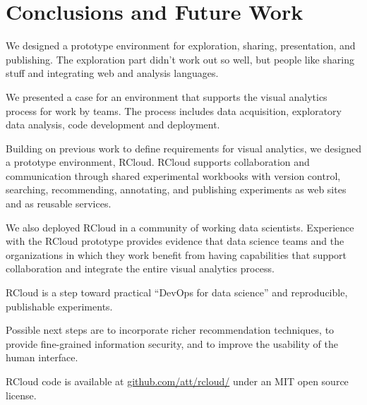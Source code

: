 \section{Conclusions and Future Work}


 We designed a prototype environment for exploration, sharing,
presentation, and publishing. The exploration part didn't work out so well,
but people like sharing stuff and integrating web and analysis languages.


We presented a case for an environment that supports the
visual analytics process for work by teams. The process
includes data acquisition, exploratory data analysis,
code development and deployment.

Building on previous work to define requirements for
visual analytics, we designed a prototype environment, RCloud.
RCloud supports collaboration and communication
through shared experimental workbooks with version
control, searching, recommending, annotating, and publishing
experiments as web sites and as reusable services.

We also deployed RCloud in a community of working data scientists.
Experience with the RCloud prototype provides evidence that data
science teams and the organizations in which they work benefit from
having capabilities that support collaboration and integrate
the entire visual analytics process.

RCloud is a step toward practical ``DevOps for data science'' and
reproducible, publishable experiments.

Possible next steps are
to incorporate richer recommendation techniques, to provide fine-grained
information security, and to improve the usability of the human interface.

RCloud code is available at \url{github.com/att/rcloud/}
under an MIT open source license.
